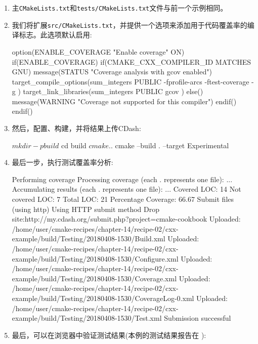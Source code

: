 \begin{enumerate}
\item 主\texttt{CMakeLists.txt}和\texttt{tests/CMakeLists.txt}文件与前一个示例相同。

\item 我们将扩展\texttt{src/CMakeLists.txt}，并提供一个选项来添加用于代码覆盖率的编译标志。此选项默认启用:

\begin{codebox}[cmake]
option(ENABLE_COVERAGE "Enable coverage" ON)
if(ENABLE_COVERAGE)
  if(CMAKE_CXX_COMPILER_ID MATCHES GNU)
    message(STATUS "Coverage analysis with gcov enabled")
    target_compile_options(sum_integers
      PUBLIC
        -fprofile-arcs -ftest-coverage -g
      )
    target_link_libraries(sum_integers
      PUBLIC
        gcov
      )
  else()
    message(WARNING "Coverage not supported for this compiler")
  endif()
endif()
\end{codebox}

\item 然后，配置、构建，并将结果上传CDash:

\begin{codebox}[shell]
$ mkdir -p build
$ cd build
$ cmake ..
$ cmake --build . --target Experimental
\end{codebox}

\item 最后一步，执行测试覆盖率分析:

\begin{codebox}[cmake]
  Performing coverage
  Processing coverage (each . represents one file):
  ...
  Accumulating results (each . represents one file):
  ...
    Covered LOC: 14
    Not covered LOC: 7
    Total LOC: 21
    Percentage Coverage: 66.67%
Submit files (using http)
  Using HTTP submit method
  Drop site:http://my.cdash.org/submit.php?project=cmake-cookbook
  Uploaded: /home/user/cmake-recipes/chapter-14/recipe-02/cxx-example/build/Testing/20180408-1530/Build.xml
  Uploaded: /home/user/cmake-recipes/chapter-14/recipe-02/cxx-example/build/Testing/20180408-1530/Configure.xml
  Uploaded: /home/user/cmake-recipes/chapter-14/recipe-02/cxx-example/build/Testing/20180408-1530/Coverage.xml
  Uploaded: /home/user/cmake-recipes/chapter-14/recipe-02/cxx-example/build/Testing/20180408-1530/CoverageLog-0.xml
  Uploaded: /home/user/cmake-recipes/chapter-14/recipe-02/cxx-example/build/Testing/20180408-1530/Test.xml
  Submission successful
\end{codebox}

\item 最后，可以在浏览器中验证测试结果(本例的测试结果报告在  ):


\end{enumerate}

